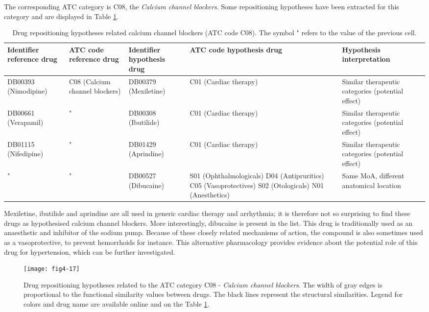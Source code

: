 The corresponding ATC category is C08, the \emph{Calcium channel blockers}. Some repositioning hypotheses have been extracted for this category and are displayed in Table \ref{tab:tablec08}. 

\begin{table}[htbp]
\scriptsize
\begin{tabular}{|p{2cm}|p{2cm}|p{2cm}|p{3cm}|p{4cm}|}
\hline
\textbf{Identifier reference drug} & \textbf{ATC code reference drug} & \textbf{Identifier hypothesis drug} & \textbf{ATC code hypothesis drug} & \textbf{Hypothesis interpretation} \\ \hline
DB00393 (Nimodipine) & C08 (Calcium channel blockers) & DB00379 (Mexiletine) & C01 (Cardiac therapy) & Similar therapeutic categories (potential effect) \\ \hline
DB00661 (Verapamil) & " & DB00308 (Ibutilide) & C01 (Cardiac therapy) & Similar therapeutic categories (potential effect) \\ \hline
DB01115 (Nifedipine) & " & DB01429 (Aprindine) & C01 (Cardiac therapy) & Similar therapeutic categories (potential effect) \\ \hline
" & " & DB00527 (Dibucaine) & S01 (Ophthalmologicals)
D04 (Antipruritics)
C05 (Vasoprotectives)
S02 (Otologicals)
N01 (Anesthetics) & Same MoA, different anatomical location \\ \hline
\end{tabular}
\caption{Drug repositioning hypotheses related calcium channel blockers (ATC code C08). The symbol " refers to the value of the previous cell.}
\label{tab:tablec08}
\end{table}

Mexiletine, ibutilide and aprindine are all used in generic cardiac therapy and arrhythmia; it is therefore not so surprising to find these drugs as hypothesised calcium channel blockers. More interestingly, dibucaine is present in the list. This drug is traditionally used as an anaesthetic and inhibitor of the sodium pump. Because of these closely related mechanisms of action, the compound is also sometimes used as a vasoprotective, to prevent hemorrhoids for instance. This alternative pharmacology provides evidence about the potential role of this drug for hypertension, which can be further investigated.

\begin{figure}[H]
    \centering
    \texttt{[image: fig4-17]}
    \caption{Drug repositioning hypotheses related to the ATC category C08 - \emph{Calcium channel blockers}. The width of gray edges is proportional to the functional similarity values between drugs. The black lines represent the structural similarities. Legend for colors and drug name are available online and on the Table \ref{tab:tablec08}.}
    \label{fig4-17}
\end{figure}

